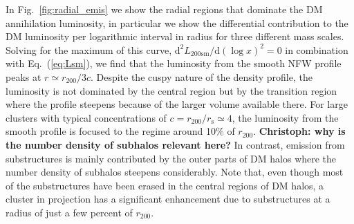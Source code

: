 \documentclass[10pt,aps,pra,reprint,amsmath,amsfonts,amssymb,showpacs,nofootinbib,floatfix]{revtex4-1}
\newcommand{\rmn}{\mathrm}
\newcommand{\s}{\rmn{s}}
\newcommand{\sm}{\rmn{sm}}
\newcommand{\dd}{\rmn{d}}
\newcommand{\rvir}{r_{200}}
\begin{document}
In Fig.~\ref{fig:radial_emis} we show the radial regions that dominate
the DM annihilation luminosity, in particular we show the differential
contribution to the DM luminosity per logarithmic interval in radius
for three different mass scales. Solving for the maximum of this
curve, $\dd^2L_{200\sm}/\dd (\log x)^2=0$ in combination with
Eq.~(\ref{eq:Lsm}), we find that the luminosity from the smooth NFW
profile peaks at $r \simeq \rvir/3c$. Despite the cuspy nature of the
density profile, the luminosity is not dominated by the central region
but by the transition region where the profile steepens because of the
larger volume available there. For large clusters with typical
concentrations of $c = r_{200}/r_\s \simeq 4$, the luminosity from the
smooth profile is focused to the regime around 10\% of $\rvir$. {\bf
  Christoph: why is the number density of subhalos relevant here?} In contrast,
emission from substructures is mainly contributed by the outer parts
of DM halos where the number density of subhalos steepens
considerably.  Note that, even though most of the substructures have
been erased in the central regions of DM halos, a cluster in
projection has a significant enhancement due to substructures at a
radius of just a few percent of $\rvir$.
\end{document}
